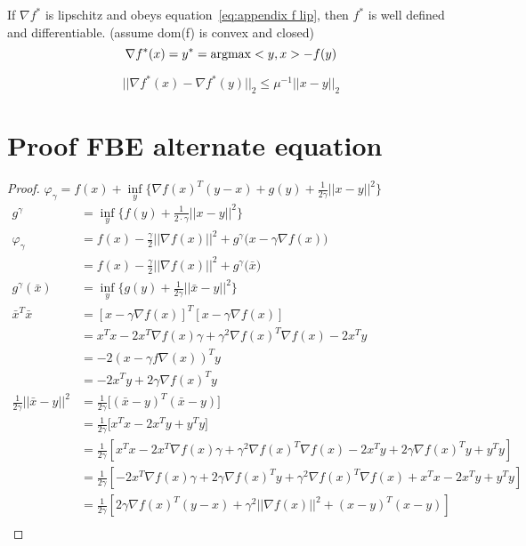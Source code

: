 		If $\nabla f^*$ is lipschitz and obeys equation~\ref{eq:appendix f lip}, then $f^*$ is well defined and differentiable. (assume dom(f) is convex and closed)
		\begin{equation}
			\nabla f^*(x) = y^* = \operatorname{argmax} <y,x> - f(y)
		\end{equation}
		
		\begin{equation}
			|| \nabla f^*(x) - \nabla f^*(y) ||_2 \leq \mu^{-1} ||x-y||_2
			\label{eq:appendix f lip}
		\end{equation}
\clearpage
\chapter{Proof FBE alternate equation}

\begin{proof}
	$\varphi_{\gamma} =   f(x) + \underset{y}{\inf} \Big\{ \nabla f(x)^T(y-x) + g(y) + \frac{1}{2 \gamma} ||x-y||^2  \Big\} $
	\begin{align*}
	g^{\gamma} 	&=  \underset{y}{\inf} \big \{f(y)+\frac{1}{2 \cdot \gamma}||x-y||^2 \big \} \\
	\varphi_{\gamma} 
	&= f(x) - \frac{\gamma}{2}||\nabla f(x)||^2 + g^{\gamma} \big(x-\gamma \nabla f(x) \big) \\
	&= f(x) - \frac{\gamma}{2}||\nabla f(x)||^2 + g^{\gamma} \big(\bar{x} \big)\\
	g^{\gamma} (\bar{x})
	&=\underset{y}{\inf} \Big\{g(y)+\frac{1}{2 \gamma}||\bar{x}-y||^2 \Big\}	\\
	\bar{x}^T\bar{x}
	&=[x- \gamma \nabla f(x)]^T[x- \gamma \nabla f(x)] \\
	&= x^Tx -2x^T\nabla f(x) \gamma + \gamma^2 \nabla f(x)^T\nabla f(x)-2x^Ty \\
	&=-2(x-\gamma f\nabla(x))^Ty\\
	&=-2x^Ty + 2\gamma \nabla f(x)^Ty \\
	\frac{1}{2 \gamma}||\bar{x}-y||^2
	&=\frac{1}{2 \gamma} \Big [ (\bar{x}-y)^T(\bar{x}-y) \Big]\\
	&=\frac{1}{2 \gamma} \Big [ x^Tx - 2 x^Ty + y^Ty \Big]\\
	& =\frac{1}{2 \gamma}[x^Tx-2x^T\nabla f(x) \gamma + \gamma^2 \nabla f(x)^T\nabla f(x) -2x^Ty + 2\gamma \nabla f(x)^Ty +y^Ty] \\
	& = \frac{1}{2 \gamma}[-2x^T\nabla f(x) \gamma  + 2\gamma \nabla f(x)^Ty + \gamma^2 \nabla f(x)^T\nabla f(x) +x^Tx -2x^Ty +y^Ty]\\
	&= \frac{1}{2 \gamma}[ 2\gamma \nabla f(x)^T(y-x) + \gamma^2||\nabla f(x)||^2 + (x-y)^T(x-y)]\\

\end{align*}
\end{proof}
